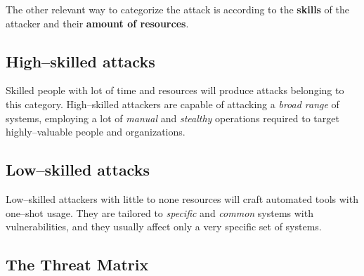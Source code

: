 \documentclass[10pt]{\classname}
\begin{document}
The other relevant way to categorize the attack is according to the
\textbf{skills} of the attacker and their \textbf{amount of resources}.

\subsection{High--skilled attacks}

Skilled people with lot of time and resources will produce attacks belonging to
this category. High--skilled attackers are capable of attacking a \emph{broad
range} of systems, employing a lot of \emph{manual} and \emph{stealthy}
operations required to target highly--valuable people and organizations.

\subsection{Low--skilled attacks}

Low--skilled attackers with little to none resources will craft automated tools
with one--shot usage. They are tailored to \emph{specific} and \emph{common}
systems with vulnerabilities, and they usually affect only a very specific set
of systems.

\subsection{The Threat Matrix}
\end{document}
